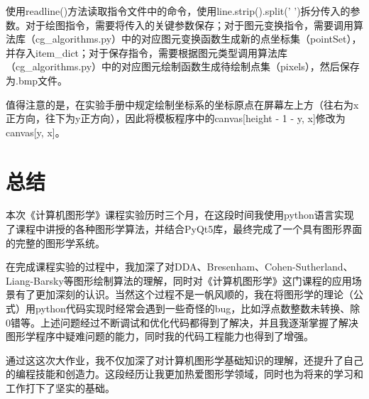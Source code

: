 \documentclass[a4paper,UTF8]{article}
\theoremstyle{definition}
\begin{document}
使用readline()方法读取指令文件中的命令，使用line.strip().split(' ')拆分传入的参数。对于绘图指令，需要将传入的关键参数保存；对于图元变换指令，需要调用算法库（cg\_algorithms.py）中的对应图元变换函数生成新的点坐标集（pointSet），并存入item\_dict；对于保存指令，需要根据图元类型调用算法库（cg\_algorithms.py）中的对应图元绘制函数生成待绘制点集（pixels），然后保存为.bmp文件。

值得注意的是，在实验手册中规定绘制坐标系的坐标原点在屏幕左上方（往右为x正方向，往下为y正方向），因此将模板程序中的canvas[height - 1 - y, x]修改为canvas[y, x]。

\section{总结}
本次《计算机图形学》课程实验历时三个月，在这段时间我使用python语言实现了课程中讲授的各种图形学算法，并结合PyQt5库，最终完成了一个具有图形界面的完整的图形学系统。

在完成课程实验的过程中，我加深了对DDA、Bresenham、Cohen-Sutherland、Liang-Barsky等图形绘制算法的理解，同时对《计算机图形学》这门课程的应用场景有了更加深刻的认识。当然这个过程不是一帆风顺的，我在将图形学的理论（公式）用python代码实现时经常会遇到一些奇怪的bug，比如浮点数整数未转换、除0错等。上述问题经过不断调试和优化代码都得到了解决，并且我逐渐掌握了解决图形学程序中疑难问题的能力，同时我的代码工程能力也得到了增强。

通过这这次大作业，我不仅加深了对计算机图形学基础知识的理解，还提升了自己的编程技能和创造力。这段经历让我更加热爱图形学领域，同时也为将来的学习和工作打下了坚实的基础。
\end{document}
